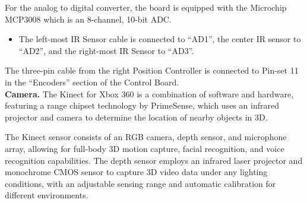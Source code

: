 For the analog to digital converter, the board is equipped with the Microchip MCP3008 which is an 8-channel, 10-bit ADC.
\begin{itemize}
    \item The left-most IR Sensor cable is connected to “AD1”, the center IR sensor to “AD2”, and the right-most IR Sensor to “AD3”.
\end{itemize}

The three-pin cable from the right Position Controller is connected to Pin-set 11 in the “Encoders” section of the Control Board.\\

\textbf{Camera.} The Kinect for Xbox 360 is a combination of software and hardware, featuring a range chipset technology by PrimeSense, which uses an infrared projector and camera to determine the location of nearby objects in 3D. 

The Kinect sensor consists of an RGB camera, depth sensor, and microphone array, allowing for full-body 3D motion capture, facial recognition, and voice recognition capabilities. The depth sensor employs an infrared laser projector and monochrome CMOS sensor to capture 3D video data under any lighting conditions, with an adjustable sensing range and automatic calibration for different environments.\\

